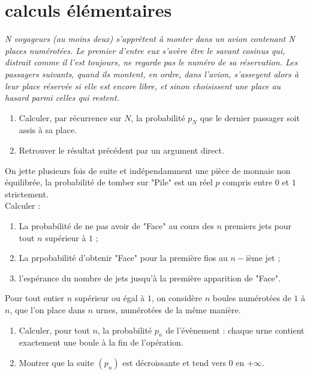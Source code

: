 \section{calculs \'el\'ementaires}

\begin{exer}
\textit{N voyageurs (au moins deux) s'apprêtent à monter dans un avion contenant N places num\'erot\'ees. %
Le premier d'entre eux s'av\`ere être le savant cosinus qui, distrait comme il l'est toujours, ne regarde pas le num\'ero de sa r\'eservation. %
Les passagers suivants, quand ils montent, en ordre, dans l'avion, s'asseyent alors \`a leur place r\'eserv\'ee si elle est encore libre, %
et sinon choisissent une place au hasard parmi celles qui restent.}
\ligneinter
\begin{enumerate}
\item Calculer, par r\'ecurrence sur $N$, la probabilit\'e $p_N$ que le dernier passager soit assis \`a sa place.
\item Retrouver le r\'esultat pr\'ec\'edent par un argument direct.
\end{enumerate}
\end{exer}

\begin{exer}
On jette plusieurs fois de suite et ind\'ependamment une pi\`ece de monnaie non \'equilibr\'ee, la probabilit\'e de tomber sur "Pile" est un r\'eel $p$ compris entre $0$ et $1$ strictement.\\
Calculer :
\begin{enumerate}
\item La probabilit\'e de ne pas avoir de "Face" au cours des $n$ premiers jets pour tout $n$ sup\'erieur \`a $1$ ;
\item La prpobabilit\'e d'obtenir "Face" pour la premi\`ere fios au $n-$i\`eme jet ;
\item l'esp\'erance du nombre de jets jusqu'\`a la premi\`ere apparition de "Face".
\end{enumerate}
\end{exer}

\begin{exer}
Pour tout entier $n$ sup\'erieur ou \'egal à $1$, on consid\`ere $n$ boules num\'erot\'ees de $1$ \`a $n$, que l'on place dans $n$ urnes, num\'erot\'ees de la m\^eme mani\`ere.
\begin{enumerate}
\item Calculer, pour tout $n$, la probabilit\'e $p_n$ de l'\'ev\`enement : chaque urne contient exactement une boule \`a la fin de l'op\'eration.
\item Montrer que la suite $(p_n)$ est d\'ecroissante et tend vers $0$ en $+\infty$.
\end{enumerate}
\end{exer}
